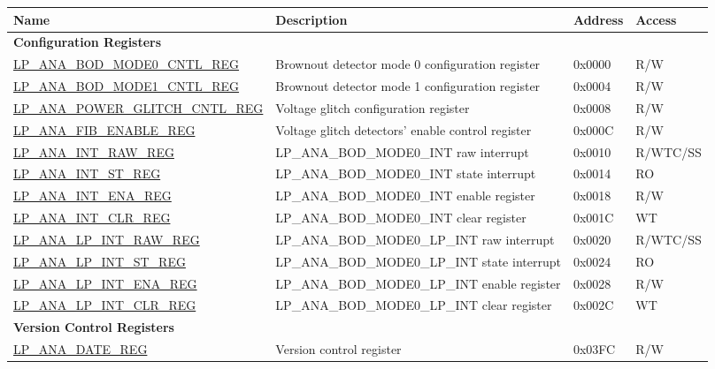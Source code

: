 \begin{longtable}{ | l | p{7.2cm} | l | l | }
\hline\rowcolor{lightgray}
\textbf{Name} & \textbf{Description} &  \textbf{Address} & \textbf{Access} \\ \hline
\endhead
\multicolumn{4}{|l|}{\textbf{Configuration Registers}} \\ \hline
\hyperref[regdesc:LPANABODMODE0CNTLREG]{LP\_ANA\_BOD\_MODE0\_CNTL\_REG} & Brownout detector mode 0 configuration register & 0x0000 & R/W \\ \hline\hyperref[regdesc:LPANABODMODE1CNTLREG]{LP\_ANA\_BOD\_MODE1\_CNTL\_REG} &  Brownout detector mode 1 configuration register & 0x0004 & R/W \\  
\hline\hyperref[regdesc:LPANAPOWERGLITCHCNTLREG]{LP\_ANA\_POWER\_GLITCH\_CNTL\_REG} & Voltage glitch configuration register & 0x0008 & R/W \\  
\hline\hyperref[regdesc:LPANAFIBENABLEREG]{LP\_ANA\_FIB\_ENABLE\_REG} & Voltage glitch detectors' enable control register & 0x000C & R/W \\ \hline\hyperref[regdesc:LPANAINTRAWREG]{LP\_ANA\_INT\_RAW\_REG} &  LP\_ANA\_BOD\_MODE0\_INT raw interrupt & 0x0010 & R/WTC/SS \\ \hline\hyperref[regdesc:LPANAINTSTREG]{LP\_ANA\_INT\_ST\_REG} & LP\_ANA\_BOD\_MODE0\_INT state interrupt & 0x0014 & RO \\ \hline\hyperref[regdesc:LPANAINTENAREG]{LP\_ANA\_INT\_ENA\_REG} & LP\_ANA\_BOD\_MODE0\_INT enable register & 0x0018 & R/W \\ \hline\hyperref[regdesc:LPANAINTCLRREG]{LP\_ANA\_INT\_CLR\_REG} & LP\_ANA\_BOD\_MODE0\_INT clear register & 0x001C & WT \\ \hline\hyperref[regdesc:LPANALPINTRAWREG]{LP\_ANA\_LP\_INT\_RAW\_REG} & LP\_ANA\_BOD\_MODE0\_LP\_INT raw interrupt & 0x0020 & R/WTC/SS \\ \hline\hyperref[regdesc:LPANALPINTSTREG]{LP\_ANA\_LP\_INT\_ST\_REG} & LP\_ANA\_BOD\_MODE0\_LP\_INT state interrupt & 0x0024 & RO \\ \hline\hyperref[regdesc:LPANALPINTENAREG]{LP\_ANA\_LP\_INT\_ENA\_REG} & LP\_ANA\_BOD\_MODE0\_LP\_INT enable register & 0x0028 & R/W \\ \hline\hyperref[regdesc:LPANALPINTCLRREG]{LP\_ANA\_LP\_INT\_CLR\_REG} & LP\_ANA\_BOD\_MODE0\_LP\_INT  clear register & 0x002C & WT \\ \hline
\multicolumn{4}{|l|}{\textbf{Version Control Registers}} \\ \hline
\hyperref[regdesc:LPANADATEREG]{LP\_ANA\_DATE\_REG} & Version control register & 0x03FC & R/W \\ \hline\end{longtable}
